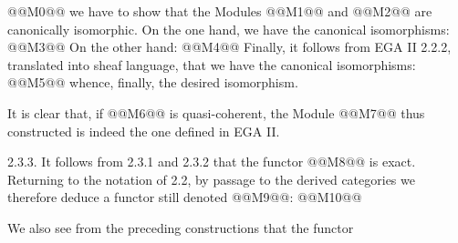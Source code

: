 @@M0@@
we have to show that the Modules @@M1@@ and @@M2@@
are canonically isomorphic. On the one hand, we have the canonical isomorphisms:
@@M3@@
On the other hand:
@@M4@@
Finally, it follows from EGA II 2.2.2, translated into sheaf language, that we have the canonical isomorphisms:
@@M5@@
whence, finally, the desired isomorphism.

It is clear that, if @@M6@@ is quasi-coherent, the Module @@M7@@ thus constructed is indeed the one defined in EGA II.

2.3.3. It follows from 2.3.1 and 2.3.2 that the functor @@M8@@ is exact. Returning to the notation of 2.2, by passage to the derived categories we therefore deduce a functor still denoted @@M9@@:
@@M10@@

We also see from the preceding constructions that the functor
